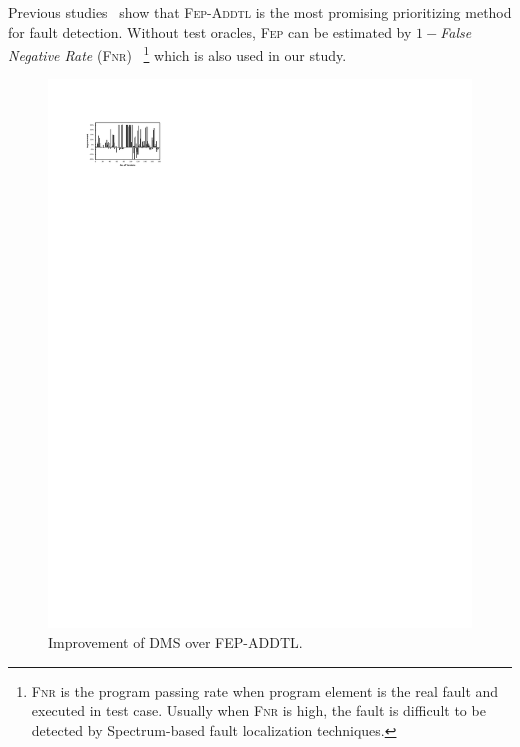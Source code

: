 \vspace{0.2cm}
Previous studies~\citep{RUCH01,SEAGMGR01} show that \textsc{Fep-Addtl} is the most
promising prioritizing method for fault detection.
Without test oracles, \textsc{Fep} can be estimated by $1 - ${\em False Negative Rate} (\textsc{Fnr})~\citep{Gonzalez-SanchezPAGG11}
\footnote{\textsc{Fnr} is the program passing rate when program element is the real fault and executed in test case. Usually when
\textsc{Fnr} is high, the fault is difficult to be detected by Spectrum-based
fault localization techniques.} which is also used in our study.



\begin{figure}[!htbp]
    \centering
    \includegraphics[width=12cm]{our_vs_fep.pdf}
    \caption{Improvement of D{\scriptsize MS} over F{\scriptsize EP}-A{\scriptsize DDTL}.}
    \label{fig:our_vs_fep}
\end{figure}

